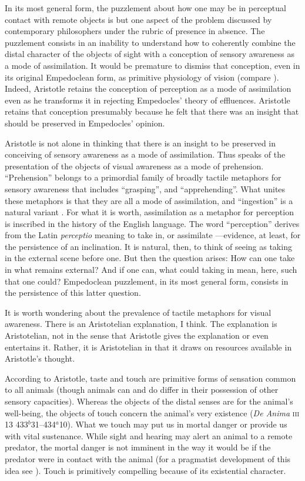 In its most general form, the puzzlement about how one may be in perceptual contact with remote objects is but one aspect of the problem discussed by contemporary philosophers under the rubric of presence in absence. The puzzlement consists in an inability to understand how to coherently combine the distal character of the objects of sight with a conception of sensory awareness as a mode of assimilation. It would be premature to dismiss that conception, even in its original Empedoclean form, as primitive physiology of vision (compare \citealt[318 n106]{Cherniss:1935fk}). Indeed, Aristotle retains the conception of perception as a mode of assimilation even as he transforms it in rejecting Empedocles' theory of effluences. Aristotle retains that conception presumably because he felt that there was an insight that should be preserved in Empedocles' opinion. 

Aristotle is not alone in thinking that there is an insight to be preserved in conceiving of sensory awareness as a mode of assimilation. Thus \citet{Broad:1952kx} speaks of the presentation of the objects of visual awareness as a mode of prehension.  ``Prehension'' belongs to a primordial family of broadly tactile metaphors for sensory awareness that includes ``grasping'', and ``apprehending''. What unites these metaphors is that they are all a mode of assimilation, and ``ingestion'' is a natural variant \citep[see][7]{Johnston:2006uq,Price:1932fk}. For what it is worth, assimilation as a metaphor for perception is inscribed in the history of the English language. The word ``perception'' derives from the Latin \emph{perceptio} meaning to take in, or assimilate \citep[102]{Burnyeat:1979mv}---evidence, at least, for the persistence of an inclination. It is natural, then, to think of seeing as taking in the external scene before one. But then the question arises: How can one take in what remains external? And if one can, what could taking in mean, here, such that one could? Empedoclean puzzlement, in its most general form, consists in the persistence of this latter question.

It is worth wondering about the prevalence of tactile metaphors for visual awareness. There is an Aristotelian explanation, I think. The explanation is Aristotelian, not in the sense that Aristotle gives the explanation or even entertains it. Rather, it is Aristotelian in that it draws on resources available in Aristotle's thought.

According to Aristotle, taste and touch are primitive forms of sensation common to all animals (though animals can and do differ in their possession of other sensory capacities). Whereas the objects of the distal senses are for the animal's well-being, the objects of touch concern the animal's very existence (\emph{De Anima} \textsc{iii} 13 433\( ^{b} \)31--434\( ^{a} \)10). What we touch may put us in mortal danger or provide us with vital sustenance. While sight and hearing may alert an animal to a remote predator, the mortal danger is not imminent in the way it would be if the predator were in contact with the animal (for a pragmatist development of this idea see \citealt[22--23]{Bergson:1912pi}). Touch is primitively compelling because of its existential character.

